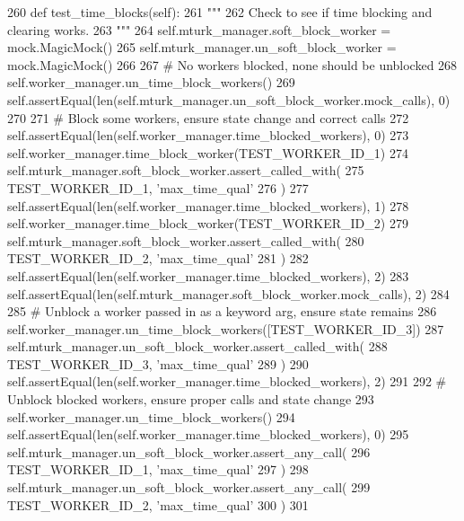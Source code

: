 \begin{DoxyCode}
260     \textcolor{keyword}{def }test\_time\_blocks(self):
261         \textcolor{stringliteral}{"""}
262 \textcolor{stringliteral}{        Check to see if time blocking and clearing works.}
263 \textcolor{stringliteral}{        """}
264         self.mturk\_manager.soft\_block\_worker = mock.MagicMock()
265         self.mturk\_manager.un\_soft\_block\_worker = mock.MagicMock()
266 
267         \textcolor{comment}{# No workers blocked, none should be unblocked}
268         self.worker\_manager.un\_time\_block\_workers()
269         self.assertEqual(len(self.mturk\_manager.un\_soft\_block\_worker.mock\_calls), 0)
270 
271         \textcolor{comment}{# Block some workers, ensure state change and correct calls}
272         self.assertEqual(len(self.worker\_manager.time\_blocked\_workers), 0)
273         self.worker\_manager.time\_block\_worker(TEST\_WORKER\_ID\_1)
274         self.mturk\_manager.soft\_block\_worker.assert\_called\_with(
275             TEST\_WORKER\_ID\_1, \textcolor{stringliteral}{'max\_time\_qual'}
276         )
277         self.assertEqual(len(self.worker\_manager.time\_blocked\_workers), 1)
278         self.worker\_manager.time\_block\_worker(TEST\_WORKER\_ID\_2)
279         self.mturk\_manager.soft\_block\_worker.assert\_called\_with(
280             TEST\_WORKER\_ID\_2, \textcolor{stringliteral}{'max\_time\_qual'}
281         )
282         self.assertEqual(len(self.worker\_manager.time\_blocked\_workers), 2)
283         self.assertEqual(len(self.mturk\_manager.soft\_block\_worker.mock\_calls), 2)
284 
285         \textcolor{comment}{# Unblock a worker passed in as a keyword arg, ensure state remains}
286         self.worker\_manager.un\_time\_block\_workers([TEST\_WORKER\_ID\_3])
287         self.mturk\_manager.un\_soft\_block\_worker.assert\_called\_with(
288             TEST\_WORKER\_ID\_3, \textcolor{stringliteral}{'max\_time\_qual'}
289         )
290         self.assertEqual(len(self.worker\_manager.time\_blocked\_workers), 2)
291 
292         \textcolor{comment}{# Unblock blocked workers, ensure proper calls and state change}
293         self.worker\_manager.un\_time\_block\_workers()
294         self.assertEqual(len(self.worker\_manager.time\_blocked\_workers), 0)
295         self.mturk\_manager.un\_soft\_block\_worker.assert\_any\_call(
296             TEST\_WORKER\_ID\_1, \textcolor{stringliteral}{'max\_time\_qual'}
297         )
298         self.mturk\_manager.un\_soft\_block\_worker.assert\_any\_call(
299             TEST\_WORKER\_ID\_2, \textcolor{stringliteral}{'max\_time\_qual'}
300         )
301 
\end{DoxyCode}


